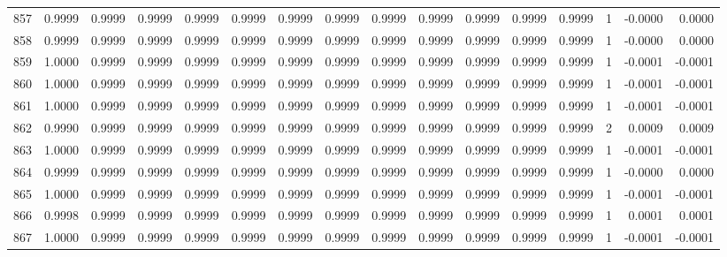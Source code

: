 \begin{tabular}{lrrrrrrrrrrrrrrr}
857 &      0.9999 &  0.9999 &  0.9999 &  0.9999 &  0.9999 &  0.9999 &  0.9999 &  0.9999 &  0.9999 &  0.9999 &   0.9999 &     0.9999 &      1 &                   -0.0000 &                     0.0000 \\
858 &      0.9999 &  0.9999 &  0.9999 &  0.9999 &  0.9999 &  0.9999 &  0.9999 &  0.9999 &  0.9999 &  0.9999 &   0.9999 &     0.9999 &      1 &                   -0.0000 &                     0.0000 \\
859 &      1.0000 &  0.9999 &  0.9999 &  0.9999 &  0.9999 &  0.9999 &  0.9999 &  0.9999 &  0.9999 &  0.9999 &   0.9999 &     0.9999 &      1 &                   -0.0001 &                    -0.0001 \\
860 &      1.0000 &  0.9999 &  0.9999 &  0.9999 &  0.9999 &  0.9999 &  0.9999 &  0.9999 &  0.9999 &  0.9999 &   0.9999 &     0.9999 &      1 &                   -0.0001 &                    -0.0001 \\
861 &      1.0000 &  0.9999 &  0.9999 &  0.9999 &  0.9999 &  0.9999 &  0.9999 &  0.9999 &  0.9999 &  0.9999 &   0.9999 &     0.9999 &      1 &                   -0.0001 &                    -0.0001 \\
862 &      0.9990 &  0.9999 &  0.9999 &  0.9999 &  0.9999 &  0.9999 &  0.9999 &  0.9999 &  0.9999 &  0.9999 &   0.9999 &     0.9999 &      2 &                    0.0009 &                     0.0009 \\
863 &      1.0000 &  0.9999 &  0.9999 &  0.9999 &  0.9999 &  0.9999 &  0.9999 &  0.9999 &  0.9999 &  0.9999 &   0.9999 &     0.9999 &      1 &                   -0.0001 &                    -0.0001 \\
864 &      0.9999 &  0.9999 &  0.9999 &  0.9999 &  0.9999 &  0.9999 &  0.9999 &  0.9999 &  0.9999 &  0.9999 &   0.9999 &     0.9999 &      1 &                   -0.0000 &                     0.0000 \\
865 &      1.0000 &  0.9999 &  0.9999 &  0.9999 &  0.9999 &  0.9999 &  0.9999 &  0.9999 &  0.9999 &  0.9999 &   0.9999 &     0.9999 &      1 &                   -0.0001 &                    -0.0001 \\
866 &      0.9998 &  0.9999 &  0.9999 &  0.9999 &  0.9999 &  0.9999 &  0.9999 &  0.9999 &  0.9999 &  0.9999 &   0.9999 &     0.9999 &      1 &                    0.0001 &                     0.0001 \\
867 &      1.0000 &  0.9999 &  0.9999 &  0.9999 &  0.9999 &  0.9999 &  0.9999 &  0.9999 &  0.9999 &  0.9999 &   0.9999 &     0.9999 &      1 &                   -0.0001 &                    -0.0001 \\

\end{tabular}
